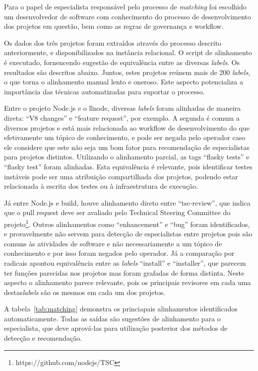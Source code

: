 \documentclass[peerreview]{acmart}
\begin{document}
Para o papel de especialista responsável pelo processo de \textit{matching} foi escolhido um desenvolvedor de software com conhecimento do processo de desenvolvimento dos projetos em questão, bem como as regras de governança e workflow.

Os dados dos três projetos foram extraídos através do processo descrito anteriormente, e disponibilizados na instância relacional. O script de alinhamento é executado, fornencendo sugestão de equivalência entre as diversas \textit{labels}. Os resultados são descritos abaixo. Juntos, estes projetos reúnem mais de 200 \textit{labels}, o que torna o alinhamento manual lento e oneroso. Este aspecto potencializa a importância das técnicas automatizadas para suportar o processo.

Entre o projeto Node.js e o llnode, diversas \textit{labels} foram alinhadas de maneira direta: ``V8 changes'' e ``feature request'', por exemplo. A segunda é comum a diversos projetos e está mais relacionada ao workflow de desenvolvimento do que efetivamente um tópico de conhecimento, e pode ser negada pelo operador caso ele considere que este não seja um bom fator para recomendação de especialistas para projetos distintos. Utilizando o alinhamento parcial, as tags ``flasky tests'' e ``flasky test'' foram alinhadas. Esta equivalência é relevante, pois identificar testes instáveis pode ser uma atribuição compartilhada dos projetos, podendo estar relacionada à escrita dos testes ou à infraestrutura de execução.

Já entre Node.js e build, houve alinhamento direto entre ``tsc-review'', que indica que o pull request deve ser avaliado pelo Technical Steering Committee do projeto\footnote{https://github.com/nodejs/TSC}. Outros alinhamentos como ``enhancement'' e ``bug'' foram identificados, e provavelmente não servem para detecção de especialistas entre projetos pois são comuns às atividades de software e não necessariamente a um tópico de conhecimento e por isso foram negados pelo operador. Já a comparação por radicais apontou equivalência entre as \textit{labels} ``install'' e ``installer'', que parecem ter funções parecidas nos projetos mas foram grafadas de forma distinta. Neste aspecto o alinhamento parece relevante, pois os principais revisores em cada uma destas\textit{labels} são os mesmos em cada um dos projetos.


A tabela~\ref{tab:matching} demonstra os princiapais alinhamentos identificados automaticamente. Todas as saídas são sugestões de alinhamento para o especialista, que deve aprová-las para utilização posterior dos métodos de detecção e recomendação.
\end{document}
